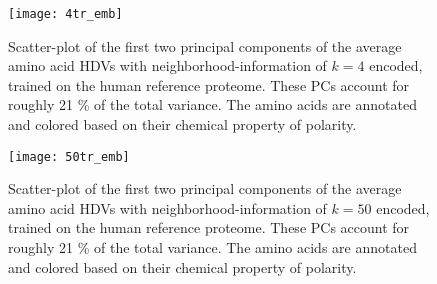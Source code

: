 \begin{figure}[H]
    \centering
    \texttt{[image: 4tr\_emb]}
    \caption{Scatter-plot of the first two principal components of the average amino acid HDVs with neighborhood-information of $k = 4$ encoded, trained on the human reference proteome. These PCs account for roughly 21 \% of the total variance. The amino acids are annotated and colored based on their chemical property of polarity.}
    \label{fig:AAtr4}
\end{figure}

\begin{figure}[H]
    \centering
    \texttt{[image: 50tr\_emb]}
    \caption{Scatter-plot of the first two principal components of the average amino acid HDVs with neighborhood-information of $k = 50$ encoded, trained on the human reference proteome. These PCs account for roughly 21 \% of the total variance. The amino acids are annotated and colored based on their chemical property of polarity.}
    \label{fig:AAtr50}
\end{figure}